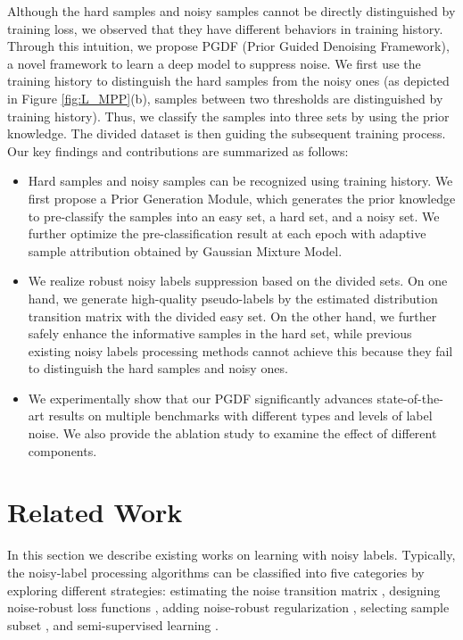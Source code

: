 \documentclass[letterpaper]{article} \usepackage{aaai22}  \usepackage{times}  \usepackage{helvet}  \usepackage{courier}  \usepackage[hyphens]{url}  \usepackage{graphicx} \urlstyle{rm} \def\UrlFont{\rm}  \usepackage{natbib}  \usepackage{caption} \DeclareCaptionStyle{ruled}{labelfont=normalfont,labelsep=colon,strut=off} \frenchspacing  \setlength{\pdfpagewidth}{8.5in}  \setlength{\pdfpageheight}{11in}  \usepackage{algorithm}
\begin{document}
{Although the hard samples and noisy samples cannot be directly distinguished by training loss, we observed that they have different behaviors in training history. Through this intuition, }we propose PGDF (Prior Guided Denoising Framework), a novel framework to learn a deep model to suppress noise. We first use the training history to distinguish the hard samples from the noisy ones (as depicted in Figure \ref{fig:L_MPP}(b), samples between two thresholds are distinguished by training history). Thus, we classify the samples into three sets by using the prior knowledge. The divided dataset is then guiding the subsequent training process. Our key {findings} and contributions are summarized as follows:
\begin{itemize}
    \item Hard samples and noisy samples can be recognized using training history. We first propose a Prior Generation Module, which generates the prior knowledge to pre-classify the samples into an easy set, a hard set, and a noisy set. We further optimize the pre-classification result at each epoch with adaptive sample attribution obtained by Gaussian Mixture Model.
    \item We realize robust noisy labels suppression based on the divided sets. On one hand, we generate high-quality pseudo-labels by the estimated distribution transition matrix with the divided easy set. On the other hand, we further safely enhance the informative samples in the hard set, while previous existing noisy labels processing methods cannot achieve this because they fail to distinguish the hard samples and noisy ones.
    \item We experimentally show that our PGDF significantly advances state-of-the-art results on multiple benchmarks with different types and levels of label noise. We also provide the ablation study to examine the effect of different components.
\end{itemize}



\section{Related Work} 
In this section we describe existing works on learning with noisy labels. Typically, the noisy-label processing algorithms can be classified into five categories by exploring different strategies: estimating the noise transition matrix \cite{goldberger2016training,patrini2017making}, designing noise-robust loss functions \cite{ghosh2017robust,2019Curriculum,xu2019l_dmi,zhou2021asymmetric,zhou2021learning}, adding noise-robust regularization \cite{2020Early,Tanno2020Learning}, selecting sample subset \cite{han2018co,chen2019understanding,huang2019o2u}, and semi-supervised learning \cite{2020DivideMix,2021LongReMix}.
\end{document}
